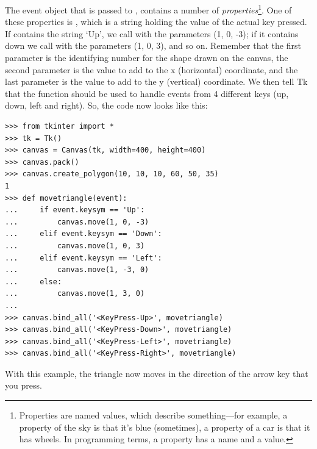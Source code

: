 The event object that is passed to , contains a number of \emph{properties}\footnote{Properties are named values, which describe something---for example, a property of the sky is that it's blue (sometimes), a property of a car is that it has wheels. In programming terms, a property has a name and a value.}.  One of these properties is , which is a string holding the value of the actual key pressed.  If  contains the string `Up', we call  with the parameters (1, 0, -3); if it contains down we call with the parameters (1, 0, 3), and so on.  Remember that the first parameter is the identifying number for the shape drawn on the canvas, the second parameter is the value to add to the x (horizontal) coordinate, and the last parameter is the value to add to the y (vertical) coordinate. We then tell Tk that the  function should be used to handle events from 4 different keys (up, down, left and right).  So, the code now looks like this:

\begin{Verbatim}[frame=single]
>>> from tkinter import *
>>> tk = Tk()
>>> canvas = Canvas(tk, width=400, height=400)
>>> canvas.pack()
>>> canvas.create_polygon(10, 10, 10, 60, 50, 35)
1
>>> def movetriangle(event):
...     if event.keysym == 'Up':
...         canvas.move(1, 0, -3)
...     elif event.keysym == 'Down':
...         canvas.move(1, 0, 3)
...     elif event.keysym == 'Left':
...         canvas.move(1, -3, 0)
...     else:
...         canvas.move(1, 3, 0)
...
>>> canvas.bind_all('<KeyPress-Up>', movetriangle)
>>> canvas.bind_all('<KeyPress-Down>', movetriangle)
>>> canvas.bind_all('<KeyPress-Left>', movetriangle)
>>> canvas.bind_all('<KeyPress-Right>', movetriangle)
\end{Verbatim}

\noindent
With this example, the triangle now moves in the direction of the arrow key that you press.

\newpage
